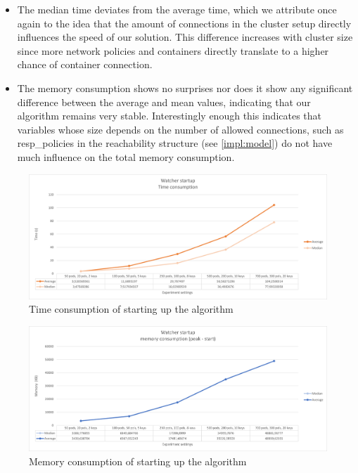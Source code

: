 \begin{itemize}
    	\item The median time deviates from the average time, which we attribute once again to the idea that the amount of connections in the cluster setup directly influences the speed of our solution. This difference increases with cluster size since more network policies and containers directly translate to a higher chance of container connection.
	\item The memory consumption shows no surprises nor does it show any significant difference between the average and mean values, indicating that our algorithm remains very stable. Interestingly enough this indicates that variables whose size depends on the number of allowed connections, such as resp\_policies  in the reachability structure (see \autoref{impl:model}) do not have much influence on the total memory consumption.

\end{itemize}

\begin{figure}[H]
    \centering
    \includegraphics[width=\textwidth]{images/experiment2/watcher-startup-time.png}
    \caption{Time consumption of starting up the algorithm}
    \label{fig:exp2-startup-time}
\end{figure}
\begin{figure}[H]
    \centering
    \includegraphics[width=\textwidth]{images/experiment2/watcher-startup-memory.png}
    \caption{Memory consumption of starting up the algorithm}
    \label{fig:exp2-startup-memory}
\end{figure}



